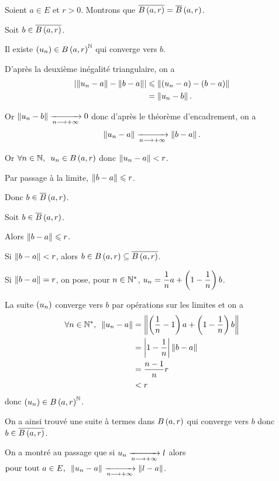 \begin{corr}
Soient \(a\in E\) et \(r>0\). Montrons que \(\conj{\bouleo{a}{r}}=\boulef{a}{r}\).

\incdir

Soit \(b\in\conj{\bouleo{a}{r}}\).

Il existe \(\paren{u_n}\in\bouleo{a}{r}^\N\) qui converge vers \(b\).

D'après la deuxième inégalité triangulaire, on a \[\begin{aligned}
\abs{\norme{u_n-a}-\norme{b-a}}&\leq\norme{\paren{u_n-a}-\paren{b-a}} \\
&=\norme{u_n-b}.
\end{aligned}\]

Or \(\norme{u_n-b}\tendqd{n\to\pinf}0\) donc d'après le théorème d'encadrement, on a \[\norme{u_n-a}\tendqd{n\to\pinf}\norme{b-a}.\]

Or \(\quantifs{\forall n\in\N}u_n\in\bouleo{a}{r}\) donc \(\norme{u_n-a}<r\).

Par passage à la limite, \(\norme{b-a}\leq r\).

Donc \(b\in\boulef{a}{r}\).

\increc

Soit \(b\in\boulef{a}{r}\).

Alors \(\norme{b-a}\leq r\).

Si \(\norme{b-a}<r\), alors \(b\in\bouleo{a}{r}\subset\conj{\bouleo{a}{r}}\).

Si \(\norme{b-a}=r\), on pose, pour \(n\in\mathbb{N}^*\), \(u_n=\dfrac{1}{n}a+\left(1-\dfrac{1}{n}\right)b\).

La suite \(\left(u_n\right)\) converge vers \(b\) par opérations sur les limites et on a \[\begin{aligned}
\quantifs{\forall n\in\Ns}\norme{u_n-a}&=\norme{\paren{\dfrac{1}{n}-1}a+\paren{1-\dfrac{1}{n}}b} \\
&=\abs{1-\dfrac{1}{n}}\norme{b-a} \\
&=\dfrac{n-1}{n}r \\
&<r
\end{aligned}\] donc \(\paren{u_n}\in\bouleo{a}{r}^\N\).

On a ainsi trouvé une suite à termes dans \(\bouleo{a}{r}\) qui converge vers \(b\) donc \(b\in\conj{\bouleo{a}{r}}\).
\end{corr}

\begin{rem}
On a montré au passage que si \(u_n\xrightarrow[n\longrightarrow+\infty]{}l\) alors \(\quantifs{\tpt a\in E}\norme{u_n-a}\tendqd{n\to\pinf}\norme{l-a}\).
\end{rem}

